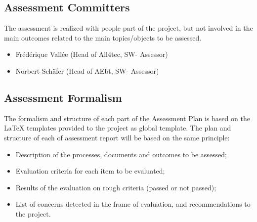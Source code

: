 \documentclass[openetcs]{template/openetcs_article}
\begin{document}
\subsection{Assessment Committers}
The assessment is realized with people part of the project, but not involved in the main outcomes related to the main topics/objects to be assessed.
\begin{itemize}
\item Fr\'ed\'erique Vall\'ee (Head of All4tec, SW- Assessor)
\item Norbert Sch\"afer (Head of AEbt, SW- Assessor)
\end{itemize}

\subsection{Assessment Formalism}
The formalism and structure of each part of the Assessment Plan is based on the LaTeX templates provided to the project as global template.
The plan and structure of each of assessment report will be based on the same principle:
 \begin{itemize}
\item Description of the processes, documents and outcomes to be assessed;
\item Evaluation criteria for each item to be evaluated;
\item Results of the evaluation on rough criteria (passed or not passed);
\item List of concerns detected in the frame of evaluation, and recommendations to the project.
\end{itemize}







\end{document}
